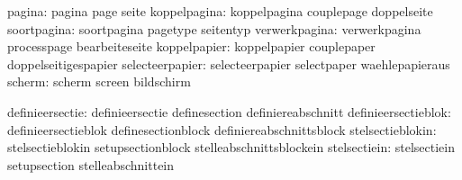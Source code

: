 
                       pagina:  pagina                       page
                                seite
                 koppelpagina:  koppelpagina                 couplepage
                                doppelseite
                  soortpagina:  soortpagina                  pagetype
                                seitentyp
                verwerkpagina:  verwerkpagina                processpage
                                bearbeiteseite
                 koppelpapier:  koppelpapier                 couplepaper
                                doppelseitigespapier
              selecteerpapier:  selecteerpapier              selectpaper
                                waehlepapieraus
                       scherm:  scherm                       screen
                                bildschirm

              definieersectie:  definieersectie              definesection
                                definiereabschnitt
          definieersectieblok:  definieersectieblok          definesectionblock
                                definiereabschnittsblock
             stelsectieblokin:  stelsectieblokin             setupsectionblock
                                stelleabschnittsblockein
                 stelsectiein:  stelsectiein                 setupsection
                                stelleabschnittein

